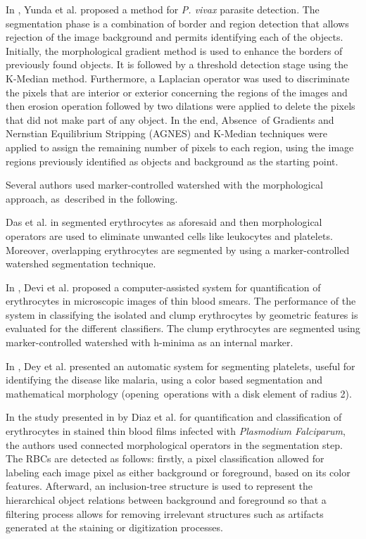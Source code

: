 \documentclass[final,a4paper,12pt,english]{UnicaPhdThesis3}
\begin{document}
In \cite{Yunda2012}, Yunda et al. proposed a method for \textit{P. vivax} parasite detection. The segmentation phase is a combination of border and region detection that allows rejection of the image background and permits identifying each of the objects. Initially, the morphological gradient method is used to enhance the borders of previously found objects. It is followed by a threshold detection stage using the K-Median method.
Furthermore, a Laplacian operator was used to discriminate the pixels that are interior or exterior concerning the regions of the images and then erosion operation followed by two dilations were applied to delete the pixels that did not make part of any object. In the end, Absence~of Gradients and Nernstian Equilibrium Stripping (AGNES) and K-Median techniques were applied to assign the remaining number of pixels to each region, using the image regions previously identified as objects and background as the starting point.

Several authors used marker-controlled watershed \cite{Soille2004} with the morphological approach, as~described in the following.

Das et al. in \cite{Das2011, Das2013, Das2014, Das2015} segmented erythrocytes as aforesaid and then morphological operators are used to eliminate unwanted cells like leukocytes and platelets. Moreover, overlapping erythrocytes are segmented by using a marker-controlled watershed segmentation technique.

In \cite{Devi2017}, Devi et al. proposed a computer-assisted system for quantification of erythrocytes in microscopic images of thin blood smears. The performance of the system in classifying the isolated and clump erythrocytes by geometric features is evaluated for the different classifiers. The clump erythrocytes are segmented using marker-controlled watershed with h-minima as an internal marker.

In \cite{Dey2015}, Dey et al. presented an automatic system for segmenting platelets, useful for identifying the disease like malaria, using a color based segmentation and mathematical morphology (opening~operations with a disk element of radius 2).

In the study presented in \cite{Diaz2009} by Diaz et al. for quantification and classification of erythrocytes in stained thin blood films infected with \textit{Plasmodium Falciparum}, the authors used connected morphological operators in the segmentation step. The RBCs are detected as follows: firstly, a pixel classification allowed for labeling each image pixel as either background or foreground, based on its color features. Afterward, an inclusion-tree structure is used to represent the hierarchical object relations between background and foreground so that a filtering process allows for removing irrelevant structures such as artifacts generated at the staining or digitization processes.
\end{document}
